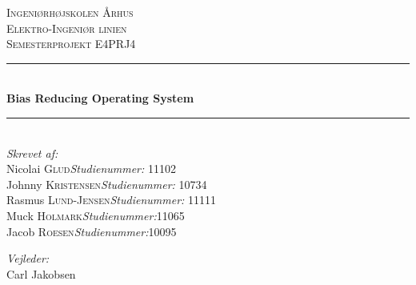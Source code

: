 \newcommand{\HRule}{\rule{\linewidth}{0.5mm}} %

\begin{center} %
 

\textsc{\LARGE Ingeniørhøjskolen Århus}\\[1.5cm] %
\textsc{\Large Elektro-Ingeniør linien}\\[0.5cm] %
\textsc{\large Semesterprojekt E4PRJ4}\\[0.5cm] %


\HRule \\[0.4cm]
{ \huge \bfseries Bias Reducing Operating System}\\[0.4cm] %
\HRule \\[1.5cm]
 

\Large \emph{Skrevet af:}\\
Nicolai \textsc{Glud}\hfill \textit{Studienummer:} 11102\\
Johnny \textsc{Kristensen}\hfill \textit{Studienummer:} 10734\\
Rasmus \textsc{Lund-Jensen}\hfill \textit{Studienummer:} 11111\\
Muck \textsc{Holmark}\hfill \textit{Studienummer:}11065\\
Jacob \textsc{Roesen}\hfill \textit{Studienummer:}10095\\
 

\vfill %

\Large \emph{Vejleder:}\hfill\phantom{m}\\
Carl Jakobsen\hfill \phantom{m}


\end{center}
